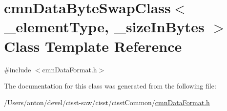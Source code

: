 \hypertarget{classcmn_data_byte_swap_class}{}\section{cmn\+Data\+Byte\+Swap\+Class$<$ \+\_\+element\+Type, \+\_\+size\+In\+Bytes $>$ Class Template Reference}
\label{classcmn_data_byte_swap_class}


{\ttfamily \#include $<$cmn\+Data\+Format.\+h$>$}



The documentation for this class was generated from the following file\+:\begin{DoxyCompactItemize}
\item 
/\+Users/anton/devel/cisst-\/saw/cisst/cisst\+Common/\hyperlink{cmn_data_format_8h}{cmn\+Data\+Format.\+h}\end{DoxyCompactItemize}
